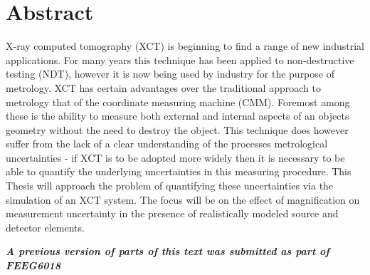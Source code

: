 \chapter*{Abstract}

X-ray computed tomography (XCT) is beginning to find a range of new industrial applications. For many years this technique has been applied to non-destructive testing (NDT), however it is now being used by industry for the purpose of metrology. XCT has certain advantages over the traditional approach to metrology that of the coordinate measuring machine (CMM). Foremost among these is the ability to measure both external and internal aspects of an objects geometry without the need to destroy the object. This technique does however suffer from the lack of a clear understanding of the processes metrological uncertainties - if XCT is to be adopted more widely then it is necessary to be able to quantify the underlying uncertainties in this measuring procedure. This Thesis will approach the problem of quantifying these uncertainties via the simulation of an XCT system. The focus will be on the effect of magnification on measurement uncertainty in the presence of realistically modeled source and detector elements.

\textbf{\textit{A previous version of parts of this text was submitted as part of FEEG6018}}
